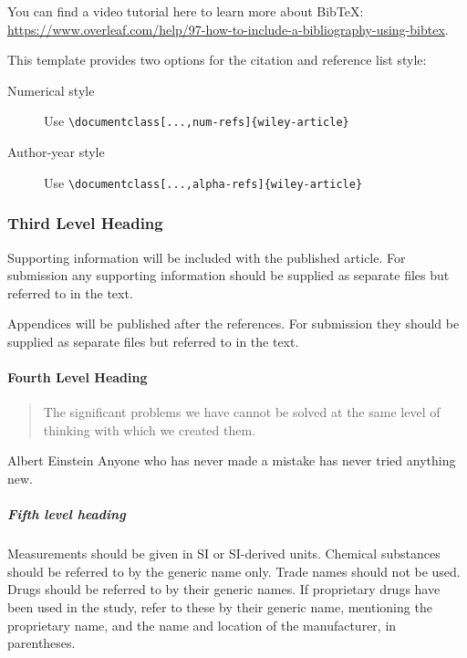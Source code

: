 \documentclass[alpha-refs]{wiley-article}
\begin{document}
You can find a video tutorial here to learn more about BibTeX: \url{https://www.overleaf.com/help/97-how-to-include-a-bibliography-using-bibtex}.

This template provides two options for the citation and reference list style: 
\begin{description}
\item[Numerical style] Use \verb|\documentclass[...,num-refs]{wiley-article}|
\item[Author-year style] Use \verb|\documentclass[...,alpha-refs]{wiley-article}|
\end{description}

\subsubsection{Third Level Heading}
Supporting information will be included with the published article. For submission any supporting information should be supplied as separate files but referred to in the text.

Appendices will be published after the references. For submission they should be supplied as separate files but referred to in the text.

\paragraph{Fourth Level Heading}
\begin{quote}
The significant problems we have cannot be solved at the same level of thinking with which we created them.
\end{quote}

\begin{epigraph}{Albert Einstein}
Anyone who has never made a mistake has never tried anything new.
\end{epigraph}

\subparagraph{Fifth level heading}
Measurements should be given in SI or SI-derived units.
Chemical substances should be referred to by the generic name only. Trade names should not be used. Drugs should be referred to by their generic names. If proprietary drugs have been used in the study, refer to these by their generic name, mentioning the proprietary name, and the name and location of the manufacturer, in parentheses.
\end{document}
